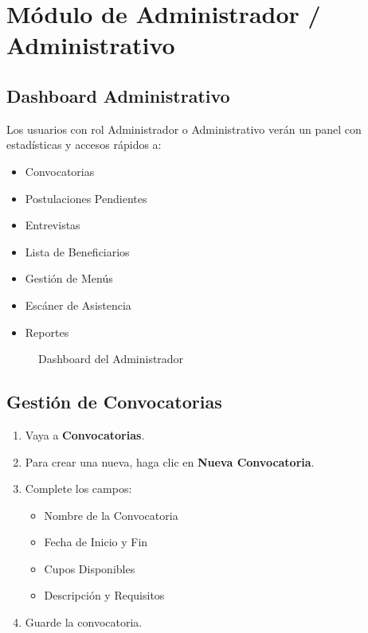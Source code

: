 \documentclass[12pt,a4paper]{article}
\begin{document}
\section{Módulo de Administrador / Administrativo}

\subsection{Dashboard Administrativo}
Los usuarios con rol Administrador o Administrativo verán un panel con estadísticas y accesos rápidos a:

\begin{itemize}
    \item Convocatorias
    \item Postulaciones Pendientes
    \item Entrevistas
    \item Lista de Beneficiarios
    \item Gestión de Menús
    \item Escáner de Asistencia
    \item Reportes
\end{itemize}

\begin{figure}[h]
    \centering
    \caption{Dashboard del Administrador}
    \label{fig:dashboard_admin}
\end{figure}

\subsection{Gestión de Convocatorias}
\begin{enumerate}
    \item Vaya a \textbf{Convocatorias}.
    \item Para crear una nueva, haga clic en \textbf{Nueva Convocatoria}.
    \item Complete los campos:
    \begin{itemize}
        \item Nombre de la Convocatoria
        \item Fecha de Inicio y Fin
        \item Cupos Disponibles
        \item Descripción y Requisitos
    \end{itemize}
    \item Guarde la convocatoria.
\end{enumerate}
\end{document}
